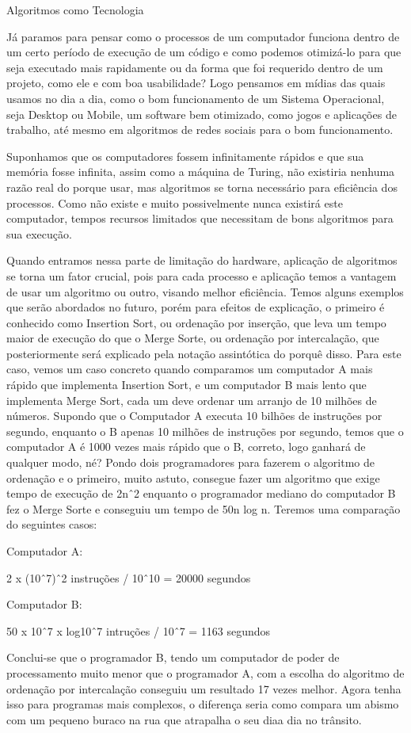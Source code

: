 Algoritmos como Tecnologia

Já paramos para pensar como o processos de um computador funciona dentro de um certo período de execução de um código
e como podemos otimizá-lo para que seja executado mais rapidamente ou da forma que foi requerido dentro de um projeto,
como ele e com boa usabilidade? Logo pensamos em mídias das quais usamos no dia a dia, como o bom funcionamento de  um
Sistema Operacional, seja Desktop ou Mobile, um software bem otimizado, como jogos e aplicações de trabalho, até mesmo
em algoritmos de redes sociais para o bom funcionamento.

Suponhamos que os computadores fossem infinitamente rápidos e que sua memória fosse infinita, assim como a máquina de Turing,
não existiria nenhuma razão real do porque usar, mas algoritmos se torna necessário para eficiência dos processos. Como não 
existe e muito possivelmente nunca existirá este computador, tempos recursos limitados que necessitam de bons algoritmos para 
sua execução.

Quando entramos nessa parte de limitação do hardware, aplicação de algoritmos se
torna um fator crucial, pois para cada processo e aplicação temos a vantagem de
usar um algoritmo ou outro, visando melhor eficiência. Temos alguns exemplos que
serão abordados no futuro, porém para efeitos de explicação, o primeiro é
conhecido como Insertion Sort, ou ordenação por inserção, que  leva um tempo
maior de execução do que o Merge Sorte, ou ordenação por intercalação, que
posteriormente será explicado pela notação assintótica do porquê disso. Para
este caso, vemos um caso concreto quando comparamos um computador A mais rápido que implementa Insertion Sort, e um
computador B mais lento que implementa Merge Sort, cada um deve ordenar um arranjo de 10 milhões de números. Supondo que
o Computador A executa 10 bilhões de instruções por segundo, enquanto o B apenas 10 milhões de instruções por segundo,
temos que o computador A é 1000 vezes mais rápido que o B, correto, logo ganhará de qualquer modo, né? Pondo dois
programadores para fazerem o algoritmo de ordenação e o primeiro, muito astuto, consegue fazer um algoritmo que exige
tempo de execução de 2nˆ2 enquanto o programador mediano do computador B fez o Merge Sorte e conseguiu um tempo de 50n
log n. Teremos uma comparação do seguintes casos:

Computador A:

2 x (10ˆ7)ˆ2 instruções / 10ˆ10 = 20000 segundos

Computador B:

50 x 10ˆ7 x log10ˆ7 intruções / 10ˆ7 = 1163 segundos

Conclui-se que o programador B, tendo um computador de poder de processamento muito menor que o programador A, com a
escolha do algoritmo de ordenação por intercalação conseguiu um resultado 17 vezes melhor. Agora tenha isso para
programas mais complexos, o diferença seria como compara um abismo com um pequeno buraco na rua que atrapalha o seu diaa
dia no trânsito.
